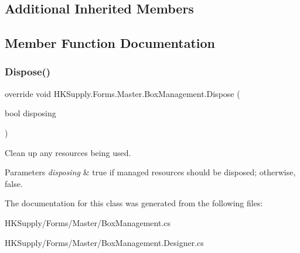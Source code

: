 \subsection*{Additional Inherited Members}


\subsection{Member Function Documentation}
\mbox{\label{class_h_k_supply_1_1_forms_1_1_master_1_1_box_management_af853e976651f5f093c0367246a5fc358}} 
\subsubsection{\texorpdfstring{Dispose()}{Dispose()}}
{\footnotesize\ttfamily override void H\+K\+Supply.\+Forms.\+Master.\+Box\+Management.\+Dispose (\begin{DoxyParamCaption}\item[{bool}]{disposing }\end{DoxyParamCaption})\hspace{0.3cm}{\ttfamily [protected]}}



Clean up any resources being used. 


\begin{DoxyParams}{Parameters}
{\em disposing} & true if managed resources should be disposed; otherwise, false.\\
\hline
\end{DoxyParams}


The documentation for this class was generated from the following files\+:\begin{DoxyCompactItemize}
\item 
H\+K\+Supply/\+Forms/\+Master/Box\+Management.\+cs\item 
H\+K\+Supply/\+Forms/\+Master/Box\+Management.\+Designer.\+cs\end{DoxyCompactItemize}
